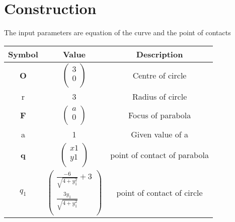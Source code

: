 \documentclass[journal,10pt,twocolumn]{article}
\begin{document}
\section*{Construction}
The input parameters are equation of the curve and the point of contacts \vspace{2mm}\\
{
\setlength\extrarowheight{2pt}
\begin{tabular}{|c|c|c|}
	\hline
	\textbf{Symbol}&\textbf{Value}&\textbf{Description}\\
	\hline
	\textbf{O}&$\begin{pmatrix}
	3\\
	0 \\
	\end{pmatrix}$&Centre of circle \\
	\hline
	r&3&Radius of circle\\
	\hline
	\textbf{F}&$\begin{pmatrix}
	a\\
	0 \\
	\end{pmatrix}$&Focus of parabola\\
	\hline
	a&1&Given value of a\\
	\hline
	\textbf{q}&$\begin{pmatrix}
	x1 \\
	y1 \\
	\end{pmatrix}$&point of contact of parabola\\ 
	\hline
	\textbf{$q_1$}&$\begin{pmatrix}
	\frac{-6}{\sqrt{4+y_1^2}} + 3 \\
    \frac{3y_1}{\sqrt{4+y_1^2}} \\
	\end{pmatrix}$&point of contact of circle \\
	\hline
\end{tabular}
}
\end{document}

